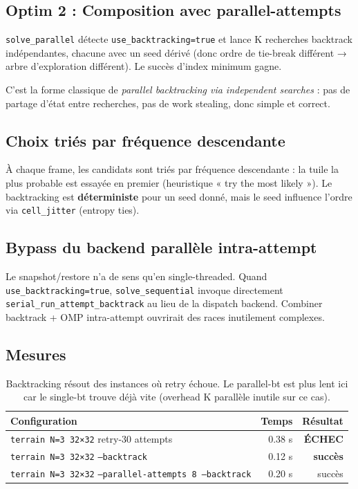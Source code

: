 \subsection{Optim 2 : Composition avec parallel-attempts}

\texttt{solve\_parallel} détecte \texttt{use\_backtracking=true} et lance K recherches backtrack indépendantes, chacune avec un seed dérivé (donc ordre de tie-break différent → arbre d'exploration différent). Le succès d'index minimum gagne.

C'est la forme classique de \textit{parallel backtracking via independent searches} : pas de partage d'état entre recherches, pas de work stealing, donc simple et correct.

\subsection{Choix triés par fréquence descendante}

À chaque frame, les candidats sont triés par fréquence descendante : la tuile la plus probable est essayée en premier (heuristique « try the most likely »). Le backtracking est \textbf{déterministe} pour un seed donné, mais le seed influence l'ordre via \texttt{cell\_jitter} (entropy ties).

\subsection{Bypass du backend parallèle intra-attempt}

Le snapshot/restore n'a de sens qu'en single-threaded. Quand \texttt{use\_backtracking=true}, \texttt{solve\_sequential} invoque directement \texttt{serial\_run\_attempt\_backtrack} au lieu de la dispatch backend. Combiner backtrack + OMP intra-attempt ouvrirait des races inutilement complexes.

\subsection{Mesures}

\begin{table}[H]
\centering
\begin{tabular}{lrr}
\toprule
\textbf{Configuration} & \textbf{Temps} & \textbf{Résultat} \\
\midrule
\texttt{terrain N=3 32×32} retry-30 attempts & 0.38 s & \textbf{ÉCHEC} \\
\texttt{terrain N=3 32×32} \texttt{--backtrack} & 0.12 s & \textbf{succès} \\
\texttt{terrain N=3 32×32} \texttt{--parallel-attempts 8 --backtrack} & 0.20 s & succès \\
\bottomrule
\end{tabular}
\caption{Backtracking résout des instances où retry échoue. Le parallel-bt est plus lent ici car le single-bt trouve déjà vite (overhead K parallèle inutile sur ce cas).}
\label{tab:ext:backtrack}
\end{table}

